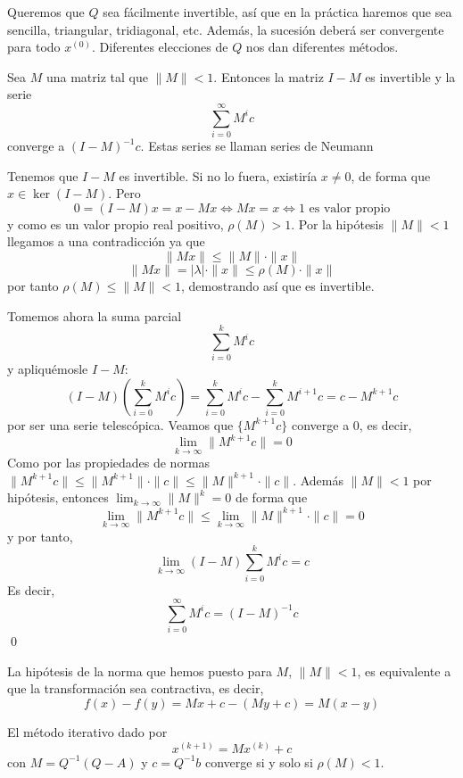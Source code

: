     \begin{obs}        
        Queremos que $Q$ sea fácilmente invertible, así que en la práctica haremos que sea sencilla, triangular, tridiagonal, etc. Además, la sucesión deberá ser convergente  para todo $x^{(0)}$. Diferentes elecciones de $Q$ nos dan diferentes métodos.
      
    \end{obs}
    \begin{lem} Sea $M$ una matriz tal que $\|M\| < 1$. Entonces la matriz $I-M$ es invertible y la serie 
    $$\sum_{i=0}^{\infty} M^i c$$
    converge a $(I-M)^{-1}c$. Estas series se llaman series de Neumann
    \end{lem}
    \begin{dem}
        Tenemos que $I-M$ es invertible. Si no lo fuera, existiría $x \neq 0$, de forma que $x \in \ker (I-M)$. Pero 
        $$0=(I-M)x=x-Mx \iff Mx=x \iff 1 \text{ es valor propio}$$
        y como es un valor propio real positivo, $\rho(M) > 1$. Por la hipótesis $\|M\|<1$ llegamos a una contradicción ya que
        $$\|Mx\|\leq \|M\|\cdot \|x\|$$
        $$\|Mx\|=|\lambda|\cdot \|x\|\leq \rho(M)\cdot \|x\|$$
        por tanto $\rho(M)\leq \|M\|<1$, demostrando así que es invertible.

        Tomemos ahora la suma parcial
        $$\sum_{i=0}^{k} M^i c$$
        y apliquémosle $I-M$:
        $$(I-M)\left(\sum_{i=0}^{k} M^i c \right)= \sum_{i=0}^{k} M^i c - \sum_{i=0}^{k} M^{i+1} c=c-M^{k+1}c $$
        por ser una serie telescópica. Veamos que $\{M^{k+1}c\}$ converge a $0$, es decir, 
        $$\lim_{k\to \infty} \|M^{k+1}c\|=0$$
        Como por las propiedades de normas $\|M^{k+1}c\|\leq \|M^{k+1}\|\cdot \|c\| \leq \|M\|^{k+1} \cdot \|c\|$. Además 
        $\|M\|<1$ por hipótesis, entonces $\displaystyle \lim_{k \to \infty} \|M\|^k=0$ de forma que
        $$\lim_{k\to \infty} \|M^{k+1}c\| \leq \lim_{k\to \infty}\|M\|^{k+1} \cdot \|c\| = 0$$
        y por tanto, 
        $$\lim_{k\to\infty}(I-M)\sum_{i=0}^{k} M^i c = c $$
        Es decir, $$\sum_{i=0}^{\infty} M^i c = (I-M)^{-1} c$$
    \qed\end{dem}
    \begin{obs}
        La hipótesis de la norma que hemos puesto para $M$, $\|M\|<1$, es equivalente a que la transformación sea contractiva, es decir,
        $$f(x)-f(y)=Mx+c-(My+c)=M(x-y)$$
    \end{obs}
    \begin{teo} El método iterativo dado por 
    $$x^{(k+1)}=M x^{(k)} + c$$
    con $M=Q^{-1}(Q-A)$ y $c=Q^{-1}b$ converge si y solo si $\rho(M)<1$.
    \end{teo}
